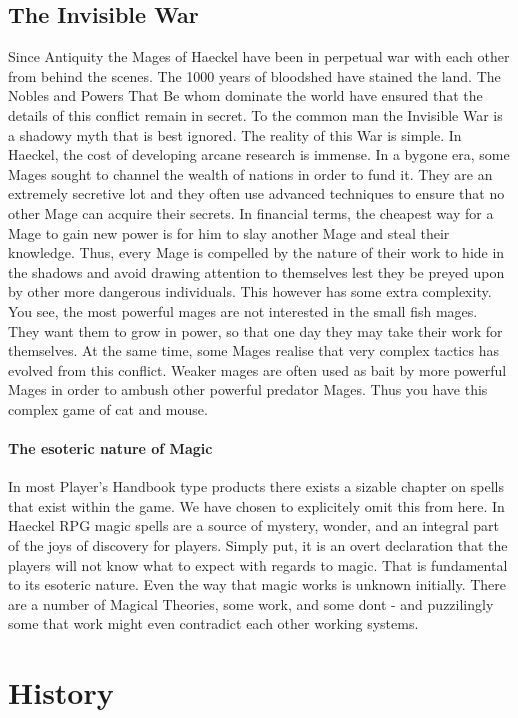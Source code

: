 \begin{multicols}{2}
\subsection{The Invisible War} Since Antiquity the Mages of Haeckel have been in perpetual war with each other from behind the scenes. The 1000 years of bloodshed have stained the land. The Nobles and Powers That Be whom dominate the world have ensured that the details of this conflict remain in secret. To the common man the Invisible War is a shadowy myth that is best ignored. The reality of this War is simple. In Haeckel, the cost of developing arcane research is immense. In a bygone era, some Mages sought to channel the wealth of nations in order to fund it. They are an extremely secretive lot and they often use advanced techniques to ensure that no other Mage can acquire their secrets. In financial terms, the cheapest way for a Mage to gain new power is for him to slay another Mage and steal their knowledge. Thus, every Mage is compelled by the nature of their work to hide in the shadows and avoid drawing attention to themselves lest they be preyed upon by other more dangerous individuals. This however has some extra complexity. You see, the most powerful mages are not interested in the small fish mages. They want them to grow in power, so that one day they may take their work for themselves. At the same time, some Mages realise that very complex tactics has evolved from this conflict. Weaker mages are often used as bait by more powerful Mages in order to ambush other powerful predator Mages. Thus you have this complex game of cat and mouse. 

\paragraph{The esoteric nature of Magic} In most Player's Handbook type products there exists a sizable chapter on spells that exist within the game. We have chosen to explicitely omit this from here. In Haeckel RPG magic spells are a source of mystery, wonder, and an integral part of the joys of discovery for players. Simply put, it is an overt declaration that the players will not know what to expect with regards to magic. That is fundamental to its esoteric nature. Even the way that magic works is unknown initially. There are a number of Magical Theories, some work, and some dont - and puzzilingly some that work might even contradict each other working systems. 


\section{History}


\end{multicols}
